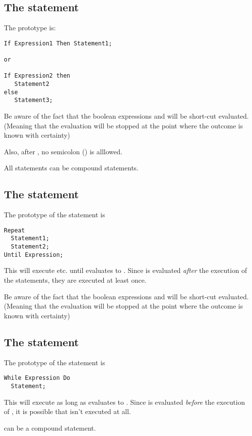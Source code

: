 \documentclass{report}
\begin{document}
\subsection{The  statement}
The  prototype is:
\begin{verbatim}
If Expression1 Then Statement1;

or 

If Expression2 then 
   Statement2
else
   Statement3;
\end{verbatim}
Be aware of the fact that the boolean expressions  and
 will be short-cut evaluated. (Meaning that the evaluation
will be stopped at the point where the outcome is known with certainty)

Also, after , no semicolon (\var{;}) is alllowed.

All statements can be compound statements.
\subsection{The  statement}
The prototype of the  statement is
\begin{verbatim}
Repeat
  Statement1;
  Statement2;
Until Expression;
\end{verbatim}
This will execute  etc. until  evaluates to
. Since  is evaluated {\em after} the execution of the
statements, they are executed at least once.

Be aware of the fact that the boolean expressions  and
 will be short-cut evaluated. (Meaning that the evaluation
will be stopped at the point where the outcome is known with certainty)

\subsection{The  statement}
The prototype of the  statement is
\begin{verbatim}
While Expression Do
  Statement;
\end{verbatim}
This will execute  as long as  evaluates to
. Since  is evaluated {\em before} the execution
of , it is possible that  isn't executed at
all.

 can be a compound statement.
\end{document}
